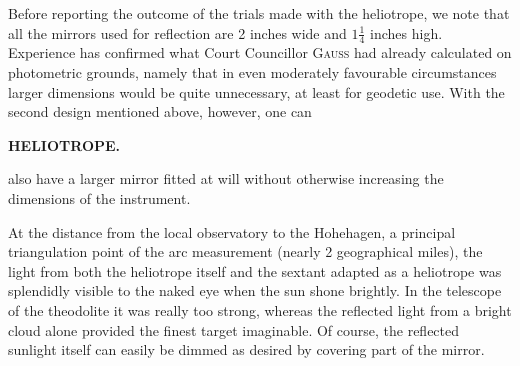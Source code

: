 \par\noindent\hspace*{\parindent}Before reporting the outcome of the trials made with the heliotrope, we note that all the mirrors used for reflection are 2 inches wide and $1\frac14$ inches high. Experience has confirmed what Court Councillor \textsc{Gauss} had already calculated on photometric grounds, namely that in even moderately favourable circumstances larger dimensions would be quite unnecessary, at least for geodetic use. With the second design mentioned above, however, one can
\par\clearpage
\noindent{}\hfill{\small\textbf{HELIOTROPE.}}\hfill\null\par\medskip
\noindent also have a larger mirror fitted at will without otherwise increasing the dimensions of the instrument.
\begin{center}
\end{center}
\par\noindent\hspace*{\parindent}At the distance from the local observatory to the Hohehagen, a principal triangulation point of the arc measurement (nearly 2 geographical miles), the light from both the heliotrope itself and the sextant adapted as a heliotrope was splendidly visible to the naked eye when the sun shone brightly. In the telescope of the theodolite it was really too strong, whereas the reflected light from a bright cloud alone provided the finest target imaginable. Of course, the reflected sunlight itself can easily be dimmed as desired by covering part of the mirror.

